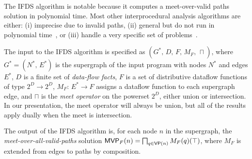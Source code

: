 
The IFDS algorithm is notable because it computes a meet-over-valid paths solution in polynomial time.
Most other interprocedural analysis algorithms are either: 
  (i) imprecise due to invalid paths,
  (ii) general but do not run in polynomial time~\cite{knoop1992interprocedural,pnueli1981two}, or 
  (iii) handle a very specific set of problems~\cite{knoop1993efficient}.



The input to the IFDS algorithm is specified as
  $(G^*,\,D,\,F,\,M_F,\,\sqcap)$,
where $G^*=(N^*,\,E^*)$ is the supergraph of the input program with nodes $N^*$ and edges $E^*$,
$D$ is a finite set of \textit{data-flow facts},
$F$ is a set of distributive dataflow functions of type $2^D\to2^D$,
$M_F:\,E^*\to F$ assigns a dataflow function to each supergraph edge,
and $\sqcap$ is the \textit{meet operator} on the powerset $2^D$, either union or intersection.
In our presentation, the meet operator will always be union, but all of the results apply dually when the
meet is intersection.

The output of the IFDS algorithm is, for each node $n$ in the supergraph, the \textit{meet-over-all-valid-paths} solution
 $\textsf{MVP}_{F}(n)=\bigsqcap_{q\in\textsf{VP}(n)}M_F(q)(\top)$, where $M_F$ is extended from edges to paths by composition.

